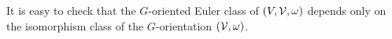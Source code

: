 \begin{rem}\label{rem:invariantGisom}
It is easy to check that the $G$-oriented Euler class of $(V,\mathcal V,\omega)$ depends only on the isomorphism class
 of the $G$-orientation $(\mathcal V,\omega)$. 
\end{rem}




